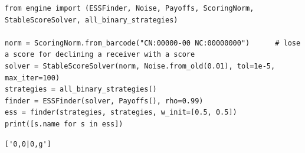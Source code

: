 \begin{lstlisting}[style=code]
from engine import (ESSFinder, Noise, Payoffs, ScoringNorm, StableScoreSolver, all_binary_strategies)

norm = ScoringNorm.from_barcode("CN:00000-00 NC:00000000")      # lose a score for declining a receiver with a score
solver = StableScoreSolver(norm, Noise.from_old(0.01), tol=1e-5, max_iter=100)
strategies = all_binary_strategies()
finder = ESSFinder(solver, Payoffs(), rho=0.99)
ess = finder(strategies, strategies, w_init=[0.5, 0.5])
print([s.name for s in ess])
\end{lstlisting}
\begin{lstlisting}[style=output]
['0,0|0,g']
\end{lstlisting}
